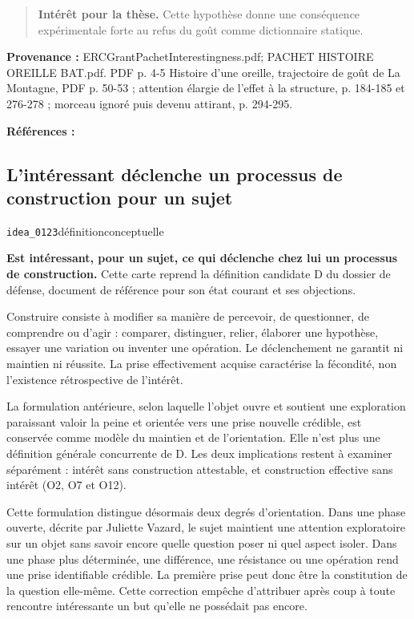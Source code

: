 \documentclass[10pt,a4paper]{article}
\begin{document}
\begin{quote}
\textbf{Intérêt pour la thèse.} Cette hypothèse donne une conséquence expérimentale forte au refus du goût comme dictionnaire statique.
\end{quote}
{\footnotesize\color{metadata}\textbf{Provenance :} ERCGrantPachetInterestingness.pdf; PACHET HISTOIRE OREILLE BAT.pdf. PDF p. 4-5 Histoire d'une oreille, trajectoire de goût de La Montagne, PDF p. 50-53 ; attention élargie de l'effet à la structure, p. 184-185 et 276-278 ; morceau ignoré puis devenu attirant, p. 294-295.\par}
{\footnotesize\color{metadata}\textbf{Références :} \parencite{pachet2018oreille}\par}

\subsection{L'intéressant déclenche un processus de construction pour un sujet}
{\small\color{metadata} \texttt{idea\_0123}\quad\textbullet\quad définition\quad\textbullet\quad conceptuelle\par}

\textbf{Est intéressant, pour un sujet, ce qui déclenche chez lui un processus de construction.} Cette carte reprend la définition candidate D du dossier de défense, document de référence pour son état courant et ses objections.

Construire consiste à modifier sa manière de percevoir, de questionner, de comprendre ou d'agir : comparer, distinguer, relier, élaborer une hypothèse, essayer une variation ou inventer une opération. Le déclenchement ne garantit ni maintien ni réussite. La prise effectivement acquise caractérise la fécondité, non l'existence rétrospective de l'intérêt.

La formulation antérieure, selon laquelle l'objet ouvre et soutient une exploration paraissant valoir la peine et orientée vers une prise nouvelle crédible, est conservée comme modèle du maintien et de l'orientation. Elle n'est plus une définition générale concurrente de D. Les deux implications restent à examiner séparément : intérêt sans construction attestable, et construction effective sans intérêt (O2, O7 et O12).

Cette formulation distingue désormais deux degrés d'orientation. Dans une phase ouverte, décrite par Juliette Vazard, le sujet maintient une attention exploratoire sur un objet sans savoir encore quelle question poser ni quel aspect isoler. Dans une phase plus déterminée, une différence, une résistance ou une opération rend une prise identifiable crédible. La première prise peut donc être la constitution de la question elle-même. Cette correction empêche d'attribuer après coup à toute rencontre intéressante un but qu'elle ne possédait pas encore.
\end{document}
